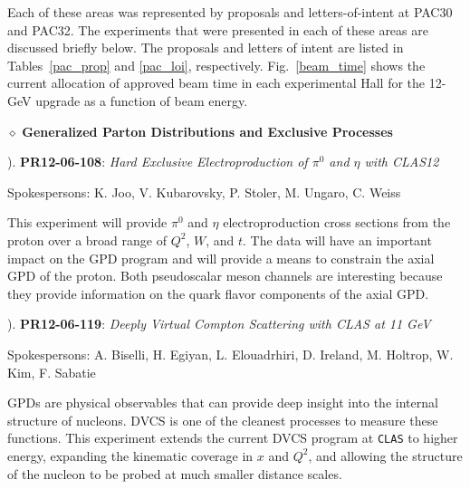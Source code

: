 Each of these areas was represented by proposals and letters-of-intent 
at PAC30 and PAC32.  The experiments that were presented in each of 
these areas are discussed briefly below.  The proposals and letters of
intent are listed in Tables~\ref{pac_prop} and \ref{pac_loi},
respectively.  Fig.~\ref{beam_time} shows the current allocation of
approved beam time in each experimental Hall for the 12-GeV upgrade as a 
function of beam energy.

\vskip 0.5cm

\noindent
\begin{large}
$\diamond$ {\bf Generalized Parton Distributions and Exclusive Processes}
\end{large}

\vskip 0.3cm

\begin{small}
). {\bf PR12-06-108}: {\it Hard Exclusive Electroproduction of
$\pi^0$ and $\eta$ with CLAS12}

\vskip 0.2cm

\begin{footnotesize}
Spokespersons: K. Joo, V. Kubarovsky, P. Stoler, M. Ungaro, C. Weiss
\end{footnotesize}

\vskip 0.2cm

This experiment will provide $\pi^0$ and $\eta$ electroproduction
cross sections from the proton over a broad range of $Q^2$, $W$, and
$t$.  The data will have an important impact on the GPD program and 
will provide a means to constrain the axial GPD of the proton.  Both 
pseudoscalar meson channels are interesting because they provide 
information on the quark flavor components of the axial GPD.

\vskip 0.3cm

). {\bf PR12-06-119}: {\it Deeply Virtual Compton Scattering with
CLAS at 11 GeV}

\vskip 0.2cm

\begin{footnotesize}
Spokespersons: A. Biselli, H. Egiyan, L. Elouadrhiri, D. Ireland, 
M. Holtrop, W. Kim, F. Sabatie 
\end{footnotesize}

\vskip 0.2cm

GPDs are physical observables that can provide deep insight into the 
internal structure of nucleons.  DVCS is one of the cleanest processes 
to measure these functions.  This experiment extends the current DVCS 
program at {\tt CLAS} to higher energy, expanding the kinematic coverage 
in $x$ and $Q^2$, and allowing the structure of the nucleon to be probed 
at much smaller distance scales.
\end{small}

